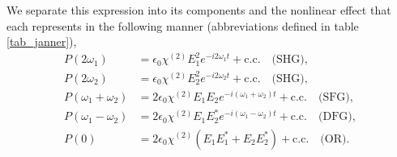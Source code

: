 We separate this expression into its components and the nonlinear effect that each represents in the following manner (abbreviations defined in table \ref{tab_janner}),
\begin{align}
P(2\omega_{1}) &= \epsilon_{0}\chi^{(2)}E^{2}_{1}e^{-i2\omega_{1}t} + \text{c.c.}\quad\text{(SHG)},\nonumber\\
P(2\omega_{2}) &= \epsilon_{0}\chi^{(2)}E^{2}_{2}e^{-i2\omega_{2}t} + \text{c.c.}\quad\text{(SHG)},\nonumber\\
P(\omega_{1}+\omega_{2}) &= 2\epsilon_{0}\chi^{(2)}E_{1}E_{2}e^{-i(\omega_{1}+\omega_{2})t} + \text{c.c.}\quad\text{(SFG)},\label{eq_list}\\
P(\omega_{1}-\omega_{2}) &= 2\epsilon_{0}\chi^{(2)}E_{1}E^{\ast}_{2}e^{-i(\omega_{1}-\omega_{2})t} + \text{c.c.}\quad\text{(DFG)},\nonumber\\
P(0) &= 2\epsilon_{0}\chi^{(2)}\left(E_{1}E^{\ast}_{1} + E_{2}E^{\ast}_{2}\right) + \text{c.c.}\quad\text{(OR)}.\nonumber
\end{align}

